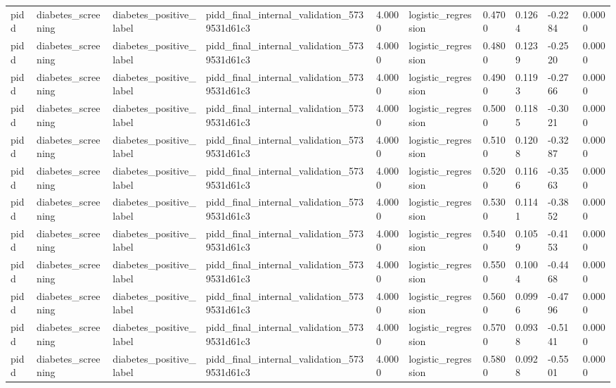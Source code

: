 \begin{tabular}{llllllllll}
pidd & diabetes\_screening & diabetes\_positive\_label & pidd\_final\_internal\_validation\_5739531d61c3 & 4.0000 & logistic\_regression & 0.4700 & 0.1264 & -0.2284 & 0.0000 \\
pidd & diabetes\_screening & diabetes\_positive\_label & pidd\_final\_internal\_validation\_5739531d61c3 & 4.0000 & logistic\_regression & 0.4800 & 0.1239 & -0.2520 & 0.0000 \\
pidd & diabetes\_screening & diabetes\_positive\_label & pidd\_final\_internal\_validation\_5739531d61c3 & 4.0000 & logistic\_regression & 0.4900 & 0.1193 & -0.2766 & 0.0000 \\
pidd & diabetes\_screening & diabetes\_positive\_label & pidd\_final\_internal\_validation\_5739531d61c3 & 4.0000 & logistic\_regression & 0.5000 & 0.1185 & -0.3021 & 0.0000 \\
pidd & diabetes\_screening & diabetes\_positive\_label & pidd\_final\_internal\_validation\_5739531d61c3 & 4.0000 & logistic\_regression & 0.5100 & 0.1208 & -0.3287 & 0.0000 \\
pidd & diabetes\_screening & diabetes\_positive\_label & pidd\_final\_internal\_validation\_5739531d61c3 & 4.0000 & logistic\_regression & 0.5200 & 0.1166 & -0.3563 & 0.0000 \\
pidd & diabetes\_screening & diabetes\_positive\_label & pidd\_final\_internal\_validation\_5739531d61c3 & 4.0000 & logistic\_regression & 0.5300 & 0.1141 & -0.3852 & 0.0000 \\
pidd & diabetes\_screening & diabetes\_positive\_label & pidd\_final\_internal\_validation\_5739531d61c3 & 4.0000 & logistic\_regression & 0.5400 & 0.1059 & -0.4153 & 0.0000 \\
pidd & diabetes\_screening & diabetes\_positive\_label & pidd\_final\_internal\_validation\_5739531d61c3 & 4.0000 & logistic\_regression & 0.5500 & 0.1004 & -0.4468 & 0.0000 \\
pidd & diabetes\_screening & diabetes\_positive\_label & pidd\_final\_internal\_validation\_5739531d61c3 & 4.0000 & logistic\_regression & 0.5600 & 0.0996 & -0.4796 & 0.0000 \\
pidd & diabetes\_screening & diabetes\_positive\_label & pidd\_final\_internal\_validation\_5739531d61c3 & 4.0000 & logistic\_regression & 0.5700 & 0.0938 & -0.5141 & 0.0000 \\
pidd & diabetes\_screening & diabetes\_positive\_label & pidd\_final\_internal\_validation\_5739531d61c3 & 4.0000 & logistic\_regression & 0.5800 & 0.0928 & -0.5501 & 0.0000 \\

\end{tabular}
